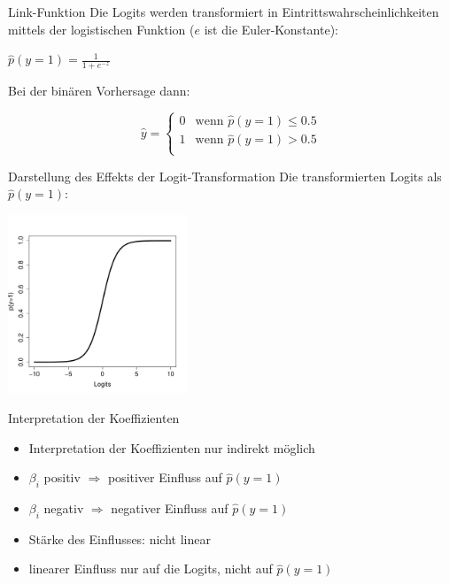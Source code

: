 \begin{frame}
  {Link-Funktion}
  Die Logits werden transformiert in Eintrittswahrscheinlichkeiten\\
  mittels der \alert{logistischen Funktion} ($e$ ist die Euler-Konstante):
  \begin{center}
    $\hat{p}(y=1)=\frac{1}{1+e^{-z}}$
  \end{center}
  \pause
  Bei der \alert{binären Vorhersage} dann:
  \begin{center}
    \[\hat{y}=
      \begin{cases}
	0 & \text{wenn }\hat{p}(y=1)\leq0.5 \\
        1 & \text{wenn }\hat{p}(y=1)>0.5 \\
      \end{cases}
    \]
  \end{center}
\end{frame}

\begin{frame}
  {Darstellung des Effekts der Logit-Transformation}
  Die transformierten Logits als $\hat{p}(y=1)$:
  \begin{center}
    \includegraphics[width=0.4\textwidth]{graphics/logits}
  \end{center}
\end{frame}

\begin{frame}
  {Interpretation der Koeffizienten}
  \begin{itemize}[<+->]
    \item Interpretation der Koeffizienten nur \alert{indirekt} möglich
    \item $\beta_i$ positiv $\Rightarrow$ positiver Einfluss auf $\hat{p}(y=1)$
    \item $\beta_i$ negativ $\Rightarrow$ negativer Einfluss auf $\hat{p}(y=1)$
    \item Stärke des Einflusses: \alert{nicht linear}
    \item linearer Einfluss nur auf die Logits, nicht auf $\hat{p}(y=1)$
  \end{itemize}
\end{frame}

